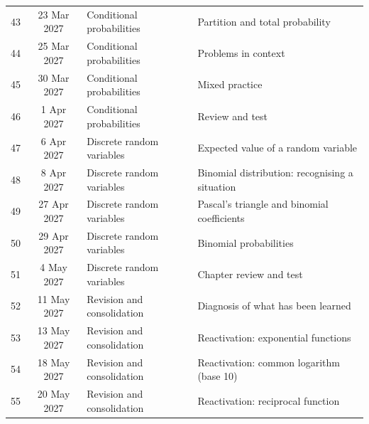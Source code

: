 \begin{longtable}{cclp{}}
43 & 23 Mar 2027 & Conditional probabilities & Partition and total probability\\
44 & 25 Mar 2027 & Conditional probabilities & Problems in context\\
45 & 30 Mar 2027 & Conditional probabilities & Mixed practice\\
46 & 1 Apr 2027 & Conditional probabilities & Review and test\\
47 & 6 Apr 2027 & Discrete random variables & Expected value of a random variable\\
48 & 8 Apr 2027 & Discrete random variables & Binomial distribution: recognising a situation\\
49 & 27 Apr 2027 & Discrete random variables & Pascal's triangle and binomial coefficients\\
50 & 29 Apr 2027 & Discrete random variables & Binomial probabilities\\
51 & 4 May 2027 & Discrete random variables & Chapter review and test\\
52 & 11 May 2027 & Revision and consolidation & Diagnosis of what has been learned\\
53 & 13 May 2027 & Revision and consolidation & Reactivation: exponential functions\\
54 & 18 May 2027 & Revision and consolidation & Reactivation: common logarithm (base 10)\\
55 & 20 May 2027 & Revision and consolidation & Reactivation: reciprocal function\\
\bottomrule
\end{longtable}
\normalsize
